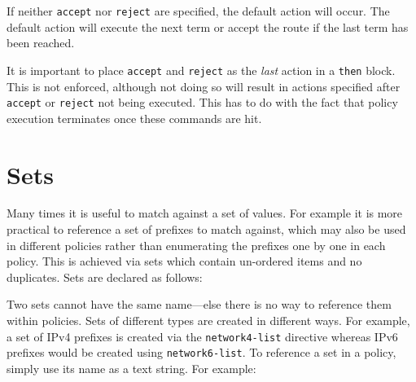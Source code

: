 If neither {\tt accept} nor {\tt reject} are specified, the default action will
occur.  The default action will execute the next term or accept the route if the
last term has been reached.

It is important to place {\tt accept} and {\tt reject} as the {\em last} action in
a {\tt then} block.  This is not enforced, although not doing so will result in
actions specified after {\tt accept} or {\tt reject} not being executed.  This
has to do with the fact that policy execution terminates once these commands are
hit.

\section{Sets}
Many times it is useful to match against a set of values.  For example it is
more practical to reference a set of prefixes to match against, which may also
be used in different policies rather than enumerating the prefixes one by one in
each policy.  This is achieved via sets which contain un-ordered items and no
duplicates.  Sets are declared as follows:

\noindent{}

Two sets cannot have the same name---else there is no way to reference them
within policies.  Sets of different types are created in different ways.  For
example, a set of IPv4 prefixes is created via the {\tt network4-list} directive
whereas IPv6 prefixes would be created using {\tt network6-list}.  To reference
a set in a policy, simply use its name as a text string.  For example:

